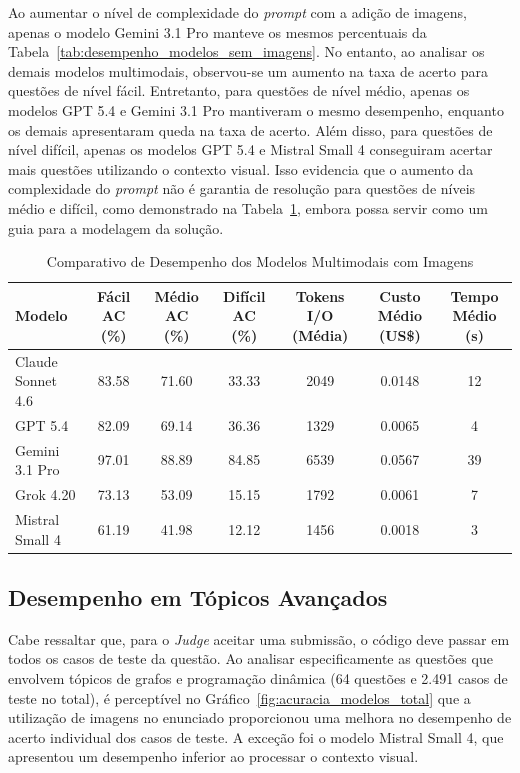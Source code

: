 \documentclass[sigconf,anonymous]{acmart} %
\begin{document}
Ao aumentar o nível de complexidade do \textit{prompt} com a adição de imagens, apenas o modelo Gemini 3.1 Pro manteve os mesmos percentuais da Tabela~\ref{tab:desempenho_modelos_sem_imagens}. No entanto, ao analisar os demais modelos multimodais, observou-se um aumento na taxa de acerto para questões de nível fácil. Entretanto, para questões de nível médio, apenas os modelos GPT 5.4 e Gemini 3.1 Pro mantiveram o mesmo desempenho, enquanto os demais apresentaram queda na taxa de acerto. Além disso, para questões de nível difícil, apenas os modelos GPT 5.4 e Mistral Small 4 conseguiram acertar mais questões utilizando o contexto visual. Isso evidencia que o aumento da complexidade do \textit{prompt} não é garantia de resolução para questões de níveis médio e difícil, como demonstrado na Tabela~\ref{tab:desempenho_modelos_com_imagens}, embora possa servir como um guia para a modelagem da solução.

\begin{table}
  \caption{Comparativo de Desempenho dos Modelos Multimodais com Imagens}
  \label{tab:desempenho_modelos_com_imagens}
  \begin{tabular}{l c c c c c c}
    \toprule
    \textbf{Modelo} & \textbf{Fácil AC (\%)} & \textbf{Médio AC (\%)} & \textbf{Difícil AC (\%)} & \textbf{Tokens I/O (Média)} & \textbf{Custo Médio (US\$)} & \textbf{Tempo Médio (s)} \\
    \midrule
    Claude Sonnet 4.6 & 83.58 & 71.60 & 33.33 & 2049 & 0.0148 & 12 \\
    GPT 5.4           & 82.09 & 69.14 & 36.36 & 1329 & 0.0065 & 4 \\
    Gemini 3.1 Pro    & 97.01 & 88.89 & 84.85 & 6539 & 0.0567 & 39 \\
    Grok 4.20         & 73.13 & 53.09 & 15.15 & 1792 & 0.0061 & 7 \\
    Mistral Small 4   & 61.19 & 41.98 & 12.12 & 1456 & 0.0018 & 3 \\
    \bottomrule
  \end{tabular}
\end{table}

\subsection{Desempenho em Tópicos Avançados}
\label{subsec:desempenho_em_topicos}

Cabe ressaltar que, para o \textit{Judge} aceitar uma submissão, o código deve passar em todos os casos de teste da questão. Ao analisar especificamente as questões que envolvem tópicos de grafos e programação dinâmica (64 questões e 2.491 casos de teste no total), é perceptível no Gráfico~\ref{fig:acuracia_modelos_total} que a utilização de imagens no enunciado proporcionou uma melhora no desempenho de acerto individual dos casos de teste. A exceção foi o modelo Mistral Small 4, que apresentou um desempenho inferior ao processar o contexto visual.
\end{document}
